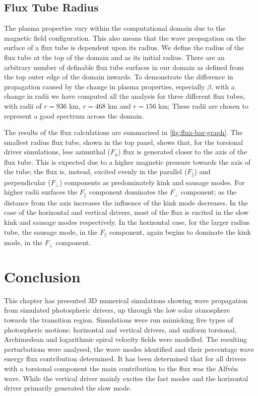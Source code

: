 \subsection{Flux Tube Radius}
The plasma properties vary within the computational domain due to the magnetic field configuration.
This also means that the wave propagation on the surface of a flux tube is dependent upon its radius. 
We define the radius of the flux tube at the top of the domain and as its initial radius.
There are an arbitrary number of definable flux tube surfaces in our domain as defined from the top outer edge of the domain inwards. 
To demonstrate the difference in propagation caused by the change in plasma properties, especially $\beta$, with a change in radii we have computed all the analysis for three different flux tubes, with radii of $r=936$ km, $r=468$ km and  $r=156$ km; These radii are chosen to represent a good spectrum across the domain.

The results of the flux calculations are summarised in \cref{fig:flux-bar-graph}.
The smallest radius flux tube, shown in the top panel, shows that, for the torsional driver simulations, less azimuthal ($F_\phi$) flux is generated closer to the axis of the flux tube. 
This is expected due to a higher magnetic pressure towards the axis of the tube; the flux is, instead, excited evenly in the parallel ($F_\parallel$) and perpendicular ($F_\perp$) components as predominately kink and sausage modes. 
For higher radii surfaces the $F_\parallel$ component dominates the $F_\perp$ component; as the distance from the axis increases the influence of the kink mode decreases.
In the case of the horizontal and vertical drivers, most of the flux is excited in the slow kink and sausage modes respectively.
In the horizontal case, for the larger radius tube, the sausage mode, in the $F_\parallel$ component, again begins to dominate the kink mode, in the $F_\perp$ component.

\section{Conclusion}
This chapter has presented 3D numerical simulations showing wave propagation from simulated photospheric drivers, up through the low solar atmosphere towards the transition region.
Simulations were run mimicking five types of photospheric motions: horizontal and vertical drivers, and uniform torsional, Archimedean and logarithmic spiral velocity fields were modelled.
The resulting perturbations were analysed, the wave modes identified and their percentage wave energy flux contribution determined. 
It has been determined that for all drivers with a torsional component the main contribution to the flux was the Alfv\'en wave.
While the vertical driver mainly excites the fast modes and the horizontal driver primarily generated the slow mode.

